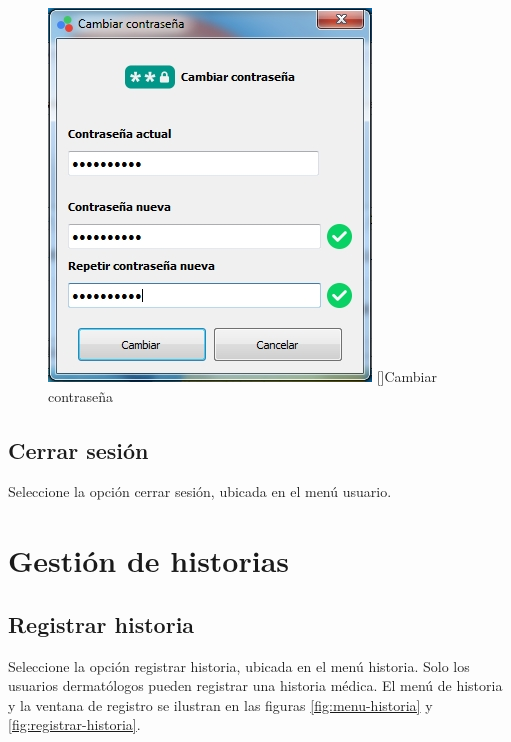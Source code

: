 \begin{figure}[H]
\begin{minipage}{.5\textwidth}
  \includegraphics[width=.9\linewidth]{./img/cambiar-clave.jpg}
  []{Cambiar contrase\~{n}a\label{fig:cambiar-clave}}
  \label{fig:test2}
\end{minipage}
\end{figure}

	\subsection*{Cerrar sesi\'{o}n}
	
	Seleccione la opci\'{o}n cerrar sesi\'{o}n, ubicada en el men\'{u} usuario.

\newpage

\section*{Gesti\'{o}n de historias}

	\subsection*{Registrar historia}
	
	Seleccione la opci\'{o}n registrar historia, ubicada en el men\'{u} historia. Solo los usuarios dermat\'{o}logos pueden registrar una historia m\'{e}dica. El men\'{u} de historia y la ventana de registro se ilustran en las figuras \ref{fig:menu-historia} y \ref{fig:registrar-historia}.

